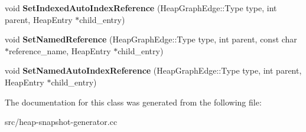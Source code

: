 \begin{DoxyCompactItemize}
\item 
\hypertarget{classv8_1_1internal_1_1_snapshot_filler_a90de312519ccebf2a5161c83ee3f07e0}{}void {\bfseries Set\+Indexed\+Auto\+Index\+Reference} (Heap\+Graph\+Edge\+::\+Type type, int parent, Heap\+Entry $\ast$child\+\_\+entry)\label{classv8_1_1internal_1_1_snapshot_filler_a90de312519ccebf2a5161c83ee3f07e0}

\item 
\hypertarget{classv8_1_1internal_1_1_snapshot_filler_a8eac46edf338b70ce71ba9e0f3b6d6e6}{}void {\bfseries Set\+Named\+Reference} (Heap\+Graph\+Edge\+::\+Type type, int parent, const char $\ast$reference\+\_\+name, Heap\+Entry $\ast$child\+\_\+entry)\label{classv8_1_1internal_1_1_snapshot_filler_a8eac46edf338b70ce71ba9e0f3b6d6e6}

\item 
\hypertarget{classv8_1_1internal_1_1_snapshot_filler_a9684fe34c03774b631a709ac0120caf2}{}void {\bfseries Set\+Named\+Auto\+Index\+Reference} (Heap\+Graph\+Edge\+::\+Type type, int parent, Heap\+Entry $\ast$child\+\_\+entry)\label{classv8_1_1internal_1_1_snapshot_filler_a9684fe34c03774b631a709ac0120caf2}

\end{DoxyCompactItemize}


The documentation for this class was generated from the following file\+:\begin{DoxyCompactItemize}
\item 
src/heap-\/snapshot-\/generator.\+cc\end{DoxyCompactItemize}
